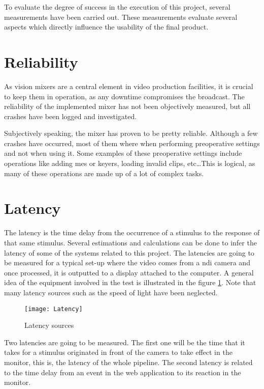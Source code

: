 \documentclass[../main.tex]{subfiles}
\begin{document}
\label{chap:results}

To evaluate the degree of success in the execution of this project, several measurements have been carried out. These measurements evaluate several aspects which directly influence the usability of the final product.\newline

\section{Reliability}
As vision mixers are a central element in video production facilities, it is crucial to keep them in operation, as any downtime compromises the broadcast. The reliability of the implemented mixer has not been objectively measured, but all crashes have been logged and investigated.\newline

Subjectively speaking, the mixer has proven to be pretty reliable. Although a few crashes have occurred, most of them where when performing preoperative settings and not when using it. Some examples of these preoperative settings include operations like adding \glspl{me} or keyers, loading invalid clips, etc\dots This is logical, as many of these operations are made up of a lot of complex tasks.\newline


\section{Latency}
The latency is the time delay from the occurrence of a stimulus to the response of that same stimulus. Several estimations and calculations can be done to infer the latency of some of the systems related to this project. The latencies are going to be measured for a typical set-up where the video comes from a \gls{ndi} camera and once processed, it is outputted to a display attached to the computer. A general idea of the equipment involved in the test is illustrated in the figure \ref{fig:05:latency_sources}. Note that many latency sources such as the speed of light have been neglected.\newline

\begin{figure}[htbp]
    \centering
    \texttt{[image: Latency]}
    \caption{Latency sources}
    \label{fig:05:latency_sources}
\end{figure}

Two latencies are going to be measured. The first one will be the time that it takes for a stimulus originated in front of the camera to take effect in the monitor, this is, the latency of the whole pipeline. The second latency is related to the time delay from an event in the web application to its reaction in the monitor.\newline
\end{document}
